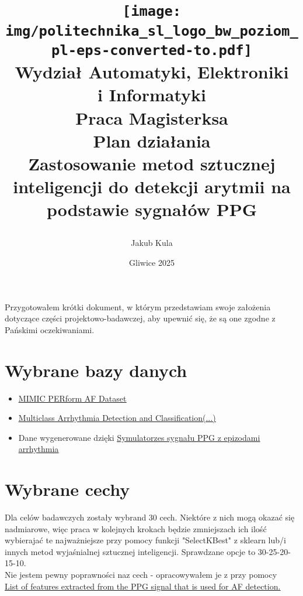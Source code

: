 \documentclass[12pt,titlepage]{article}
\title{
\texttt{[image: img/politechnika\_sl\_logo\_bw\_poziom\_pl-eps-converted-to.pdf]}\\
\textbf{Wydział Automatyki, Elektroniki\\
i Informatyki}\\
\vspace*{1cm}
Praca Magisterksa \\ Plan działania \\ 	Zastosowanie metod sztucznej inteligencji do detekcji arytmii na podstawie sygnałów PPG 

\vspace*{5cm}
}
\author{
Jakub Kula\\
}
\date{Gliwice 2025}
\begin{document}
\maketitle



\newpage
Przygotowałem krótki dokument, w którym przedstawiam swoje założenia dotyczące części projektowo-badawczej, aby upewnić się, że są one zgodne z Pańskimi oczekiwaniami.
\section{Wybrane bazy danych}
\begin{itemize}
    \item \href{https://ppg-beats.readthedocs.io/en/latest/datasets/mimic_perform_af/}{\underline{MIMIC PERform AF Dataset}}
    \item \href{https://github.com/zdzdliu/PPGArrhythmiaDetection}{\underline{Multiclass Arrhythmia Detection and Classification(...)}}
    \item Dane wygenerowane dzięki \href{https://physionet.org/content/ecg-ppg-simulator-arrhythmia/1.3.1/}{\underline{Symulatorzes sygnału PPG z epizodami arrhythmia}}
\end{itemize}
\section{Wybrane cechy}
Dla celów badawczych zostały wybrand 30 cech. Niektóre z nich mogą okazać się nadmiarowe, więc praca w kolejnych krokach będzie zmniejszach ich ilość wybierajać te najważniejsze przy pomocy funkcji "SelectKBest" z sklearn lub/i innych metod wyjaśnialnej sztucznej inteligencji. Sprawdzane opcje to 30-25-20-15-10.\\ Nie jestem pewny poprawności naz cech - opracowywałem je z przy pomocy \\
\href{https://www.researchgate.net/figure/List-of-features-extracted-from-the-PPG-signal-that-is-used-for-AF-detection_tbl2_338598269}{\underline{List of features extracted from the PPG signal that is used for AF detection.}}
\end{document}
